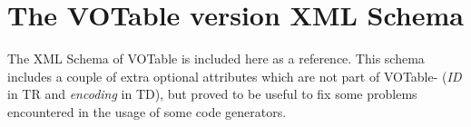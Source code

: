 \documentclass[11pt,a4paper]{ivoa}
\begin{document}



\clearpage
\appendix
{}

\bigskip

\section{The VOTable version \ivoaDocversion{}  XML Schema}
\label{XML-schema}
The XML Schema of VOTable \ivoaDocversion{} is included here as a reference.
This schema includes a couple of extra optional attributes which are not
part of VOTable-\ivoaDocversion{} ({\em ID} in TR and {\em encoding} in TD),
but proved to be useful to fix some problems encountered in the
usage of some code generators.
\bigskip
\small

\normalsize
\end{document}
